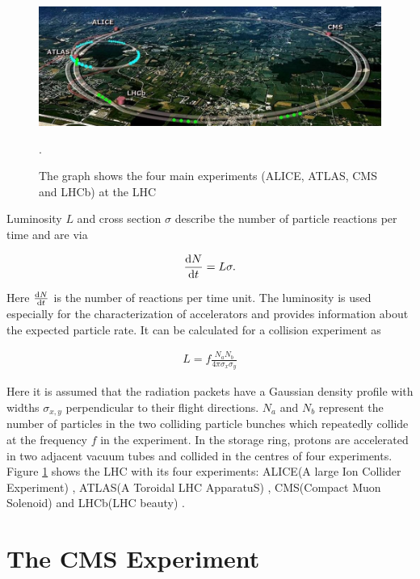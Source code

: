 \documentclass[12pt, a4paper]{thesis}
\begin{document}
\begin{figure}[hbtp]
  \centering
  \includegraphics[width=\textwidth]{../images/lhc.jpeg}
  \caption{The graph shows the four main experiments (ALICE, ATLAS,
    CMS and LHCb) at the LHC \cite{lhcmap}}.
  \label{4experiments}
\end{figure}

Luminosity $L$ and cross section $\sigma$ describe the number of
particle reactions per time and are via

\begin{align}
  \dv{N}{t} = L \sigma.
\end{align}

Here \(\dv{N}{t}\) is the number of reactions per time unit.  The
luminosity is used especially for the characterization of accelerators
and provides information about the expected particle rate. It can be
calculated for a collision experiment as

\begin{align}
  L = f \frac{N_{a}N_{b}}{4 \pi \sigma_{x} \sigma_{y}}
\end{align}

Here it is assumed that the radiation packets have a Gaussian density
profile with widths \(\sigma_{x,y}\) perpendicular to their flight
directions.  \(N_{a}\) and \(N_{b}\) represent the number of particles
in the two colliding particle bunches which repeatedly collide at the
frequency \(f\) in the experiment.  In the storage ring, protons are
accelerated in two adjacent vacuum tubes and collided in the centres
of four experiments. Figure \ref{4experiments} shows the LHC with its
four experiments: ALICE(A large Ion Collider Experiment) \cite{alice},
ATLAS(A Toroidal LHC ApparatuS) \cite{atlas}, CMS(Compact Muon
Solenoid) \cite{cms} and LHCb(LHC beauty) \cite{lhcb}.

\clearpage
\section{The CMS Experiment}
\label{sec:orge5edd5f}
\end{document}
